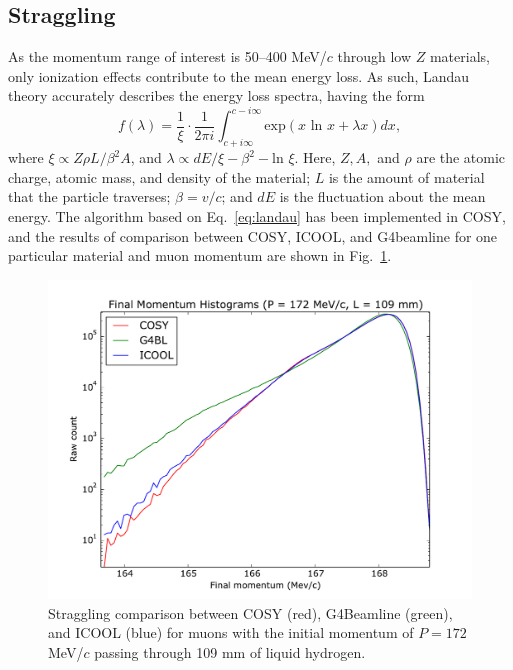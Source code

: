 \documentclass{jacow}
\begin{document}
\subsection{Straggling}
As the momentum range of interest is 50--400 MeV/$c$ through low $Z$ materials, only ionization effects contribute to the mean energy loss. As such, Landau theory accurately describes the energy loss spectra, having the form \cite{landau}
\begin{equation}
f(\lambda) = \frac{1}{\xi} \cdot \frac{1}{2\pi i} \int_{c+i \infty} ^{c-i \infty} \text{exp}(x\text{ ln } x + \lambda x) dx,
\label{eq:landau}
\end{equation}
where $\xi \propto Z\rho L/\beta^2 A$, and $\lambda \propto dE/\xi - \beta^2 - \text{ln } \xi$. Here, $Z, A,$ and $\rho$ are the atomic charge, atomic mass, and density of the material; $L$ is the amount of material that the particle traverses; $\beta=v/c$; and $dE$ is the fluctuation about the mean energy. The algorithm based on Eq.~\eqref{eq:landau} has been implemented in COSY, and the results of comparison between COSY, ICOOL, and G4beamline for one particular material and muon momentum are shown in Fig.~\ref{fig:straggling}.



\begin{figure}[htbf]
\centering
\includegraphics[width=\columnwidth]{straggling.pdf}
\caption{Straggling comparison between COSY (red), G4Beamline (green), and ICOOL (blue) for muons with the initial momentum of $P=172$ MeV/$c$ passing through 109 mm of liquid hydrogen.}
\label{fig:straggling}
\end{figure}
\end{document}
